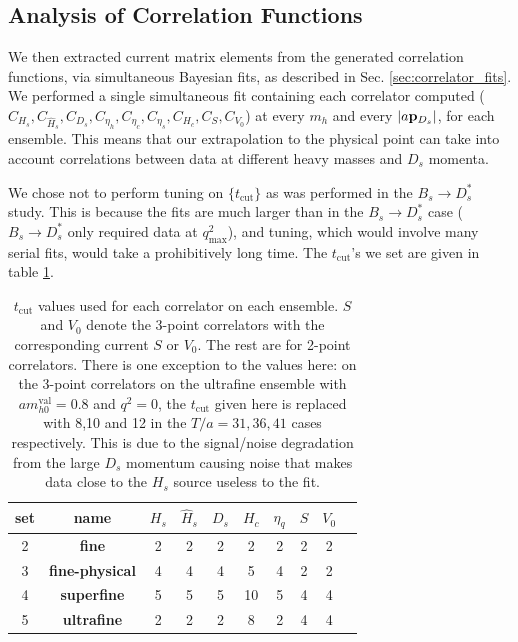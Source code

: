 \subsection{Analysis of Correlation Functions}

We then extracted current matrix elements from the generated correlation functions, via simultaneous Bayesian fits, as described in Sec. \ref{sec:correlator_fits}. We performed a single simultaneous fit containing each correlator computed ($C_{H_s},C_{\hat{H}_s},C_{D_s},C_{\eta_h},C_{\eta_c},C_{\eta_s},C_{H_c},C_S,C_{V_0}$) at every $m_h$ and every $|a{\bf{p}}_{D_s}|$, for each ensemble. This means that our extrapolation to the physical point can take into account correlations between data at different heavy masses and $D_s$ momenta.

We chose not to perform tuning on $\{t_{\text{cut}}\}$ as was performed in the $B_s\to D_s^*$ study. This is because the fits are much larger than in the $B_s\to D_s^*$ case ($B_s\to D_s^*$ only required data at $q^2_{\text{max}}$), and tuning, which would involve many serial fits, would take a prohibitively long time. The $t_{\text{cut}}$'s we set are given in table \ref{tab:tcuts}. %

\begin{table}[htb!]
  \begin{center}
    \begin{tabular}{c c c c c c c c c c}
      \hline
      set & name & $H_s$ & $\hat{H}_s$ & $D_s$ & $H_c$ & $\eta_q$ & $S$ & $V_0$
      \\ [0.5ex]
      \hline
      2 & \bf{fine} & 2 & 2 & 2 & 2 & 2 & 2 & 2
      \\ [1ex]
      3 & \bf{fine-physical} & 4 & 4 & 4 & 5 & 4 & 2 & 2
      \\ [1ex]
      4 & \bf{superfine} & 5 & 5 & 5 & 10 & 5 & 4 & 4
      \\ [1ex]
      5 & \bf{ultrafine} & 2 & 2 & 2 & 8 & 2 & 4 & 4
      \\ [1ex]
      \hline
    \end{tabular}
  \end{center}
  \caption{$t_{\text{cut}}$ values used for each correlator on each ensemble. $S$ and $V_0$ denote the 3-point correlators with the corresponding current $S$ or $V_0$. The rest are for 2-point correlators. There is one exception to the values here: on the 3-point correlators on the ultrafine ensemble with $am^{\text{val}}_{h0}=0.8$ and $q^2=0$, the $t_{\text{cut}}$ given here is replaced with 8,10 and 12 in the $T/a=31,36,41$ cases respectively. This is due to the signal/noise degradation from the large $D_s$ momentum causing noise that makes data close to the $H_s$ source useless to the fit. \label{tab:tcuts}}
  \end{table}

